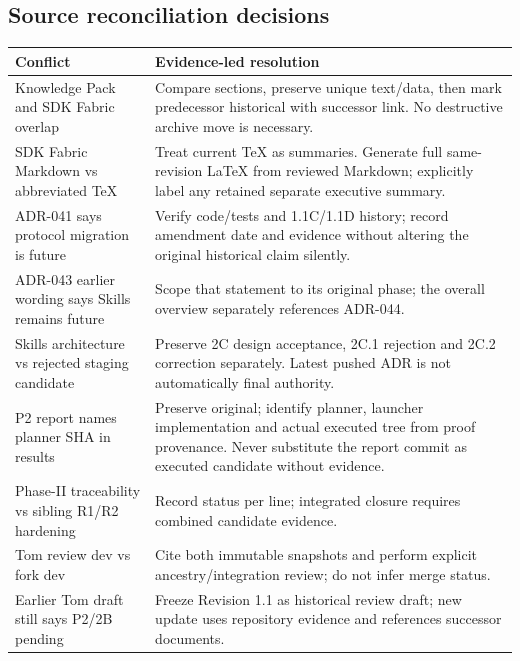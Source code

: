 \documentclass[
  11pt,
]{article}
\begin{document}
\hypertarget{source-reconciliation-decisions}{%
\subsection{Source reconciliation
decisions}\label{source-reconciliation-decisions}}

\begin{longtable}[]{@{}>{\raggedright\arraybackslash}p{}>{\raggedright\arraybackslash}p{}@{}}
\toprule\noalign{}
Conflict & Evidence-led resolution \\
\midrule\noalign{}
\endhead
\bottomrule\noalign{}
\endlastfoot
Knowledge Pack and SDK Fabric overlap & Compare sections, preserve
unique text/data, then mark predecessor historical with successor link.
No destructive archive move is necessary. \\
SDK Fabric Markdown vs abbreviated TeX & Treat current TeX as summaries.
Generate full same-revision LaTeX from reviewed Markdown; explicitly
label any retained separate executive summary. \\
ADR-041 says protocol migration is future & Verify code/tests and
1.1C/1.1D history; record amendment date and evidence without altering
the original historical claim silently. \\
ADR-043 earlier wording says Skills remains future & Scope that
statement to its original phase; the overall overview separately
references ADR-044. \\
Skills architecture vs rejected staging candidate & Preserve 2C design
acceptance, 2C.1 rejection and 2C.2 correction separately. Latest pushed
ADR is not automatically final authority. \\
P2 report names planner SHA in results & Preserve original; identify
planner, launcher implementation and actual executed tree from proof
provenance. Never substitute the report commit as executed candidate
without evidence. \\
Phase-II traceability vs sibling R1/R2 hardening & Record status per
line; integrated closure requires combined candidate evidence. \\
Tom review dev vs fork dev & Cite both immutable snapshots and perform
explicit ancestry/integration review; do not infer merge status. \\
Earlier Tom draft still says P2/2B pending & Freeze Revision 1.1 as
historical review draft; new update uses repository evidence and
references successor documents. \\
\end{longtable}
\end{document}
